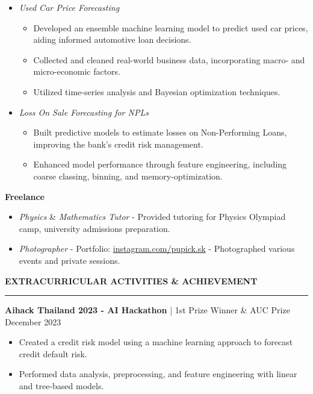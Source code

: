 \documentclass[11pt]{article}
\begin{document}
\begin{itemize}[topsep=0pt, parsep=0pt]
    \item \textit{Used Car Price Forecasting}
    {\fontsize{10pt}{11pt}\selectfont
    \begin{itemize}[noitemsep, topsep=0pt, partopsep=0pt, parsep=0pt, leftmargin=*]
        \item Developed an ensemble machine learning model to predict used car prices, aiding informed automotive loan decisions.
        \item Collected and cleaned real-world business data, incorporating macro- and micro-economic factors.
        \item Utilized time-series analysis and Bayesian optimization techniques.
    \end{itemize}
    }
    \item \textit{Loss On Sale Forecasting for NPLs}
    {\fontsize{10pt}{11pt}\selectfont
    \begin{itemize}[noitemsep, topsep=0pt, partopsep=0pt, parsep=0pt, leftmargin=*]
        \item Built predictive models to estimate losses on Non-Performing Loans, improving the bank's credit risk management.
        \item Enhanced model performance through feature engineering, including coarse classing, binning, and memory-optimization.
    \end{itemize}
    }
\end{itemize}

\textbf{Freelance}
\begin{itemize}[noitemsep, topsep=0pt, partopsep=0pt, parsep=0pt]
    \item \textit{Physics} \& \textit{Mathematics Tutor} - Provided tutoring for Physics Olympiad camp, university admissions preparation.
    \item \textit{Photographer} - Portfolio: \href{https://www.instagram.com/pupick.sk/}{instagram.com/pupick.sk} - Photographed various events and private sessions.
\end{itemize}

\vspace{6pt}
\textbf{EXTRACURRICULAR ACTIVITIES \& ACHIEVEMENT}
\vspace{5pt}
{\color{NavyBlue}\hrule}
\vspace{6pt}

\textbf{Aihack Thailand 2023 - AI Hackathon} | 1st Prize Winner \& AUC Prize \hfill December 2023
\begin{itemize}[noitemsep, topsep=0pt, partopsep=0pt, parsep=0pt]
    \item Created a credit risk model using a machine learning approach to forecast credit default risk.
    \item Performed data analysis, preprocessing, and feature engineering with linear and tree-based models.
\end{itemize}
\end{document}
